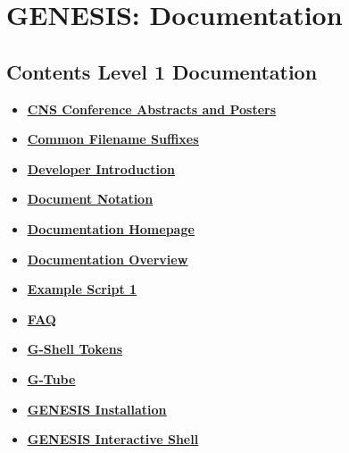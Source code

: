 \documentclass[12pt]{article}
\begin{document}
\section*{GENESIS: Documentation}

\subsection*{Contents Level 1 Documentation}

\begin{itemize}

\item \href{../cns/cns.pdf}{\bf \underline{CNS Conference Abstracts and Posters}}

\item \href{../common-suffixes/common-suffixes.pdf}{\bf \underline{Common Filename Suffixes}}

\item \href{../developer-intro/developer-intro.pdf}{\bf \underline{Developer Introduction}}

\item \href{../document-notation/document-notation.pdf}{\bf \underline{Document Notation}}

\item \href{../documentation-homepage/documentation-homepage.pdf}{\bf \underline{Documentation Homepage}}

\item \href{../documentation-overview/documentation-overview.pdf}{\bf \underline{Documentation Overview}}

\item \href{../example-script1/example-script1.pdf}{\bf \underline{Example Script 1}}

\item \href{../faq/faq.pdf}{\bf \underline{FAQ}}

\item \href{../shell-tokens/shell-tokens.pdf}{\bf \underline{G-Shell Tokens}}

\item \href{../gtube/gtube.pdf}{\bf \underline{G-Tube}}

\item \href{../genesis-installation/genesis-installation.pdf}{\bf \underline{GENESIS Installation}}

\item \href{../gshell/gshell.pdf}{\bf \underline{GENESIS Interactive Shell}}


\end{itemize}
\end{document}
